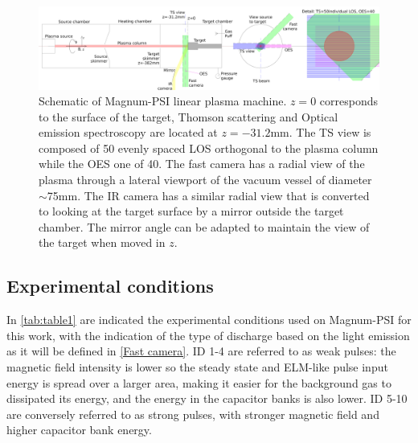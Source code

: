 \begin{figure}[!ht]
	\centering
	\includegraphics[width=\linewidth,trim={30 0 0 0},clip]{Chapters/chapter3/figs/layout_5.png}
	\caption{Schematic of Magnum-PSI linear plasma machine. $z=0$ corresponds to the surface of the target, Thomson scattering and Optical emission spectroscopy are located at $z=-31.2$mm. The TS view is composed of 50 evenly spaced LOS orthogonal to the plasma column while the OES one of 40. The fast camera has a radial view of the plasma through a lateral viewport of the vacuum vessel of diameter $\sim$75mm. The IR camera has a similar radial view that is converted to looking at the target surface by a mirror outside the target chamber. The mirror angle can be adapted to maintain the view of the target when moved in $z$.}
	\label{fig:layout}
\end{figure}


\subsection{Experimental conditions}\label{Experimental conditions}

In \autoref{tab:table1} are indicated the experimental conditions used on Magnum-PSI for this work, with the indication of the type of discharge based on the light emission as it will be defined in \autoref{Fast camera}. ID 1-4 are referred to as weak pulses: the magnetic field intensity is lower so the steady state and ELM-like pulse input energy is spread over a larger area, making it easier for the background gas to dissipated its energy, and the energy in the capacitor banks is also lower. ID 5-10 are conversely referred to as strong pulses, with stronger magnetic field and higher capacitor bank energy.



